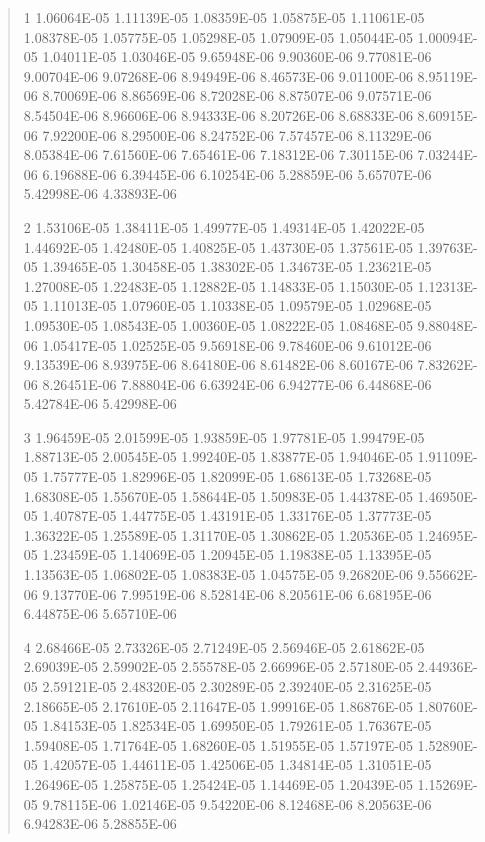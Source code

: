 \documentclass[letterpaper,10pt,english]{sphinxmanual}
\begin{document}
\begin{quote}
\begin{DUlineblock}{0em}
\item[]
\begin{DUlineblock}{\DUlineblockindent}
\item[] 1   1.06064E-05  1.11139E-05  1.08359E-05  1.05875E-05  1.11061E-05  1.08378E-05  1.05775E-05  1.05298E-05  1.07909E-05  1.05044E-05  1.00094E-05  1.04011E-05  1.03046E-05  9.65948E-06  9.90360E-06  9.77081E-06  9.00704E-06  9.07268E-06  8.94949E-06  8.46573E-06  9.01100E-06  8.95119E-06  8.70069E-06  8.86569E-06  8.72028E-06  8.87507E-06  9.07571E-06  8.54504E-06  8.96606E-06  8.94333E-06  8.20726E-06  8.68833E-06  8.60915E-06  7.92200E-06  8.29500E-06  8.24752E-06  7.57457E-06  8.11329E-06  8.05384E-06  7.61560E-06  7.65461E-06  7.18312E-06  7.30115E-06  7.03244E-06  6.19688E-06  6.39445E-06  6.10254E-06  5.28859E-06  5.65707E-06  5.42998E-06  4.33893E-06
\item[] 2   1.53106E-05  1.38411E-05  1.49977E-05  1.49314E-05  1.42022E-05  1.44692E-05  1.42480E-05  1.40825E-05  1.43730E-05  1.37561E-05  1.39763E-05  1.39465E-05  1.30458E-05  1.38302E-05  1.34673E-05  1.23621E-05  1.27008E-05  1.22483E-05  1.12882E-05  1.14833E-05  1.15030E-05  1.12313E-05  1.11013E-05  1.07960E-05  1.10338E-05  1.09579E-05  1.02968E-05  1.09530E-05  1.08543E-05  1.00360E-05  1.08222E-05  1.08468E-05  9.88048E-06  1.05417E-05  1.02525E-05  9.56918E-06  9.78460E-06  9.61012E-06  9.13539E-06  8.93975E-06  8.64180E-06  8.61482E-06  8.60167E-06  7.83262E-06  8.26451E-06  7.88804E-06  6.63924E-06  6.94277E-06  6.44868E-06  5.42784E-06  5.42998E-06
\item[] 3   1.96459E-05  2.01599E-05  1.93859E-05  1.97781E-05  1.99479E-05  1.88713E-05  2.00545E-05  1.99240E-05  1.83877E-05  1.94046E-05  1.91109E-05  1.75777E-05  1.82996E-05  1.82099E-05  1.68613E-05  1.73268E-05  1.68308E-05  1.55670E-05  1.58644E-05  1.50983E-05  1.44378E-05  1.46950E-05  1.40787E-05  1.44775E-05  1.43191E-05  1.33176E-05  1.37773E-05  1.36322E-05  1.25589E-05  1.31170E-05  1.30862E-05  1.20536E-05  1.24695E-05  1.23459E-05  1.14069E-05  1.20945E-05  1.19838E-05  1.13395E-05  1.13563E-05  1.06802E-05  1.08383E-05  1.04575E-05  9.26820E-06  9.55662E-06  9.13770E-06  7.99519E-06  8.52814E-06  8.20561E-06  6.68195E-06  6.44875E-06  5.65710E-06
\item[] 4   2.68466E-05  2.73326E-05  2.71249E-05  2.56946E-05  2.61862E-05  2.69039E-05  2.59902E-05  2.55578E-05  2.66996E-05  2.57180E-05  2.44936E-05  2.59121E-05  2.48320E-05  2.30289E-05  2.39240E-05  2.31625E-05  2.18665E-05  2.17610E-05  2.11647E-05  1.99916E-05  1.86876E-05  1.80760E-05  1.84153E-05  1.82534E-05  1.69950E-05  1.79261E-05  1.76367E-05  1.59408E-05  1.71764E-05  1.68260E-05  1.51955E-05  1.57197E-05  1.52890E-05  1.42057E-05  1.44611E-05  1.42506E-05  1.34814E-05  1.31051E-05  1.26496E-05  1.25875E-05  1.25424E-05  1.14469E-05  1.20439E-05  1.15269E-05  9.78115E-06  1.02146E-05  9.54220E-06  8.12468E-06  8.20563E-06  6.94283E-06  5.28855E-06

\end{DUlineblock}
\end{DUlineblock}
\end{quote}
\end{document}
